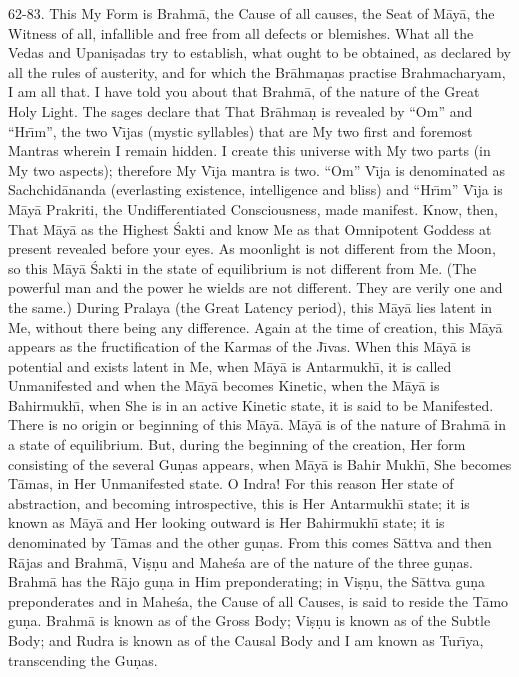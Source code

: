 62-83. This My Form is Brahm\=a, the Cause of all causes, the Seat of M\=ay\=a, the Witness of all, infallible and free from all defects or blemishes. What all the Vedas and Upani\d{s}adas try to establish, what ought to be obtained, as declared by all the rules of austerity, and for which the Br\=ahma\d{n}as practise Brahmacharyam, I am all that. I have told you about that Brahm\=a, of the nature of the Great Holy Light. The sages declare that That Br\=ahma\d{n} is revealed by ``Om'' and ``Hr\={\i}m'', the two V\={\i}jas (mystic syllables) that are My two first and foremost Mantras wherein I remain hidden. I create this universe with My two parts (in My two aspects); therefore My V\={\i}ja mantra is two. ``Om'' V\={\i}ja is denominated as Sachchid\=ananda (everlasting existence, intelligence and bliss) and ``Hr\={\i}m'' V\={\i}ja is M\=ay\=a Prakriti, the Undifferentiated Consciousness, made manifest. Know, then, That M\=ay\=a as the Highest \'Sakti and know Me as that Omnipotent Goddess at present revealed before your eyes. As moonlight is not different from the Moon, so this M\=ay\=a \'Sakti in the state of equilibrium is not different from Me. (The powerful man and the power he wields are not different. They are verily one and the same.) During Pralaya (the Great Latency period), this M\=ay\=a lies latent in Me, without there being any difference. Again at the time of creation, this M\=ay\=a appears as the fructification of the Karmas of the J\={\i}vas. When this M\=ay\=a is potential and exists latent in Me, when M\=ay\=a is Antarmukh\={\i}, it is called Unmanifested and when the M\=ay\=a becomes Kinetic, when the M\=ay\=a is Bahirmukh\={\i}, when She is in an active Kinetic state, it is said to be Manifested. There is no origin or beginning of this M\=ay\=a. M\=ay\=a is of the nature of Brahm\=a in a state of equilibrium. But, during the beginning of the creation, Her form consisting of the several Gu\d{n}as appears, when M\=ay\=a is Bahir Mukh\={\i}, She becomes T\=amas, in Her Unmanifested state. O Indra! For this reason Her state of abstraction, and becoming introspective, this is Her Antarmukh\={\i} state; it is known as M\=ay\=a and Her looking outward is Her Bahirmukh\={\i} state; it is denominated by T\=amas and the other gu\d{n}as. From this comes S\=attva and then R\=ajas and Brahm\=a, Vi\d{s}\d{n}u and Mahe\'sa are of the nature of the three gu\d{n}as. Brahm\=a has the R\=ajo gu\d{n}a in Him preponderating; in Vi\d{s}\d{n}u, the S\=attva gu\d{n}a preponderates and in Mahe\'sa, the Cause of all Causes, is said to reside the T\=amo gu\d{n}a. Brahm\=a is known as of the Gross Body; Vi\d{s}\d{n}u is known as of the Subtle Body; and Rudra is known as of the Causal Body and I am known as Tur\={\i}ya, transcending the Gu\d{n}as.

